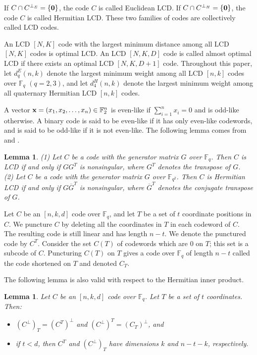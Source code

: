 \documentclass[12pt,twoside]{article}
\newcommand{\F}{\mathbb{F}}
\theoremstyle{plain}
\newtheorem{lem}[theorem]{Lemma}
\theoremstyle{definition}
\theoremstyle{remark}
\begin{document}
If $C\cap C^{\perp_E}=\{\textbf 0\}$, the code $C$ is called Euclidean LCD.
If $C\cap C^{\perp_H}=\{\textbf 0\}$, the code $C$ is called Hermitian LCD.
These two families of codes are collectively called LCD codes.

An LCD $[N, K]$ code with the largest minimum distance among all LCD $[N, K]$ codes is  optimal LCD. An LCD $[N,K,D]$ code is called almost optimal LCD if there exists an optimal  LCD $[N,K,D+1]$ code.
Throughout this paper, let $d^E_q(n, k)$ denote the largest minimum weight among all LCD
$[n, k]$ codes over $\F_q$ $(q = 2, 3)$, and let $d_4^H(n, k)$ denote the largest minimum weight among all quaternary Hermitian LCD $[n, k]$ codes.

A vector $\textbf x = (x_1, x_2, \ldots , x_n)\in \F^n_2$
is even-like if $\sum_{i=1}^nx_i=0$ and is odd-like otherwise.
A binary code is said to be even-like if it
has only even-like codewords, and is said to be odd-like if it
is not even-like.
The following lemma comes from \cite{LCD-6} and \cite{LCD-7}.
\begin{lem}
{\rm(1)} Let $C$ be a code with the generator matrix $G$ over $\F_q$. Then $C$ is LCD
if and only if $GG^T$ is nonsingular, where $G^T$ denotes the transpose of $G$.\\
{\rm(2)} Let $C$ be a code with the generator matrix $G$ over $\F_{q^2}$. Then $C$ is Hermitian LCD if and only if $G\overline{G}^T$ is nonsingular, where $\overline{G}^T$ denotes the conjugate transpose of $G$.
\end{lem}


Let $C$ be an $[n, k, d]$ code over $\F_q$, and let $T$ be a set of $t$
coordinate positions in $C$. We puncture $C$ by deleting all the
coordinates in $T$ in each codeword of $C$. The resulting code
is still linear and has length $n - t$. We denote
the punctured code by $C^T$.
Consider the set
$C(T)$ of codewords which are $0$ on $T$; this set is a subcode of $C$. Puncturing $C(T)$ on $T$ gives
a code over $\F_q$ of length $n -t$ called the code shortened on $T$ and denoted $C_T$.

The following lemma is also valid with respect to the Hermitian inner product.


\begin{lem}\label{lem-shorten-puncture}{\rm\cite{Huffman}}
Let $C$ be an $[n,k,d]$ code over $\F_q$. Let $T$ be a set of $t$ coordinates. Then:
\begin{itemize}
  \item [(i)] $(C^\perp)_T=(C^T)^\perp$ and $(C^\perp)^T=(C_T)^\perp$, and
  \item [(ii)] if $t<d$, then $C^T$ and $(C^\perp)_T$ have dimensions $k$ and $n- t- k$, respectively.
\end{itemize}
\end{lem}
\end{document}
